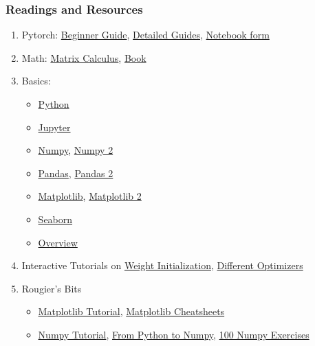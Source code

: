 \documentclass[11pt]{article}
\begin{document}
\subsubsection{Readings and Resources}
\label{sec:org9e8719c}
\begin{enumerate}
\item Pytorch: \href{https://pytorch.org/tutorials/beginner/nn\_tutorial.html}{Beginner Guide}, \href{https://deeplizard.com/learn/playlist/PLZbbT5o\_s2xrfNyHZsM6ufI0iZENK9xgG}{Detailed Guides}, \href{https://www.cs.toronto.edu//\~lczhang/360/}{Notebook form}
\item Math: \href{https://explained.ai/matrix-calculus/index.html}{Matrix Calculus}, \href{https://mml-book.com/}{Book}
\item Basics:
\begin{itemize}
\item \href{https://www.kaggle.com/learn/python}{Python}
\item \href{https://realpython.com/jupyter-notebook-introduction/\#getting-up-and-running-with-jupyter-notebook}{Jupyter}
\item \href{http://cs231n.github.io/python-numpy-tutorial/\#numpy}{Numpy}, \href{https://nbviewer.jupyter.org/github/jrjohansson/scientific-python-lectures/blob/master/Lecture-2-Numpy.ipynb}{Numpy 2}
\item \href{https://mlcourse.ai/articles/topic1-exploratory-data-analysis-with-pandas/}{Pandas}, \href{https://www.kaggle.com/learn/pandas}{Pandas 2}
\item \href{https://mlcourse.ai/articles/topic2-visual-data-analysis-in-python/}{Matplotlib}, \href{https://matplotlib.org/matplotblog/posts/an-inquiry-into-matplotlib-figures/}{Matplotlib 2}
\item \href{https://mlcourse.ai/articles/topic2-part2-seaborn-plotly/}{Seaborn}
\item \href{http://scipy-lectures.org/}{Overview}
\end{itemize}
\item Interactive Tutorials on \href{https://www.deeplearning.ai/ai-notes/initialization/}{Weight Initialization}, \href{https://www.deeplearning.ai/ai-notes/optimization/}{Different Optimizers}
\item Rougier's Bits
\begin{itemize}
\item \href{https://github.com/rougier/matplotlib-tutorial}{Matplotlib Tutorial}, \href{https://github.com/matplotlib/cheatsheets}{Matplotlib Cheatsheets}
\item \href{https://github.com/rougier/numpy-tutorial}{Numpy Tutorial}, \href{https://www.labri.fr/perso/nrougier/from-python-to-numpy/}{From Python to Numpy}, \href{https://github.com/rougier/numpy-100}{100 Numpy Exercises}

\end{itemize}
\end{enumerate}
\end{document}
